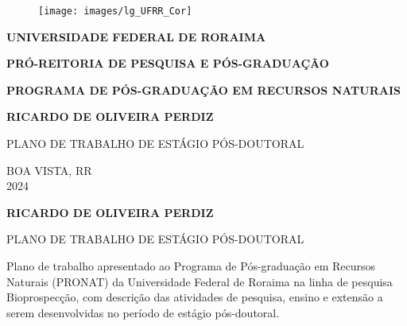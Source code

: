 \begin{titlepage}
  \thispagestyle{empty}
  \setcounter{page}{0}
    \begin{center}
      \vspace{1cm}
      \begin{figure}[h]
      \texttt{[image: images/lg\_UFRR\_Cor]}
      \centering
      \end{figure}
      \vspace{0.25cm}
      
      \textbf{\MakeUppercase{Universidade Federal de Roraima}}
      
      \vspace{0.25cm}
      
      \textbf{\MakeUppercase{Pró-reitoria de pesquisa e pós-graduação}}
      
      \vspace{0.25cm}
      
      \textbf{\MakeUppercase{Programa de pós-graduação em Recursos Naturais}}
      
      \vspace{0.25cm}

      \vspace{5cm}

      \textbf{\MakeUppercase{Ricardo de Oliveira Perdiz}}
       
      \vspace{1cm}
      
      \MakeUppercase{Plano de trabalho de estágio pós-doutoral}
      
      
      \vfill
      
      
      \MakeUppercase{Boa Vista, RR}\\
      2024
      
    \end{center}
\end{titlepage}

\newpage

\pagestyle{empty}
\centering
    \textbf{\MakeUppercase{Ricardo de Oliveira Perdiz}}
    
    \vspace{4cm}
    
    \MakeUppercase{Plano de trabalho de estágio pós-doutoral}

    \vspace{6cm}
    
    \hfill\begin{minipage}{0.5\linewidth}
        Plano de trabalho apresentado ao Programa de Pós-graduação em Recursos Naturais (PRONAT) da Universidade Federal de Roraima na linha de pesquisa Bioprospecção, com descrição das atividades de pesquisa, ensino e extensão a serem desenvolvidas no período de estágio pós-doutoral.
        \end{minipage}
    
